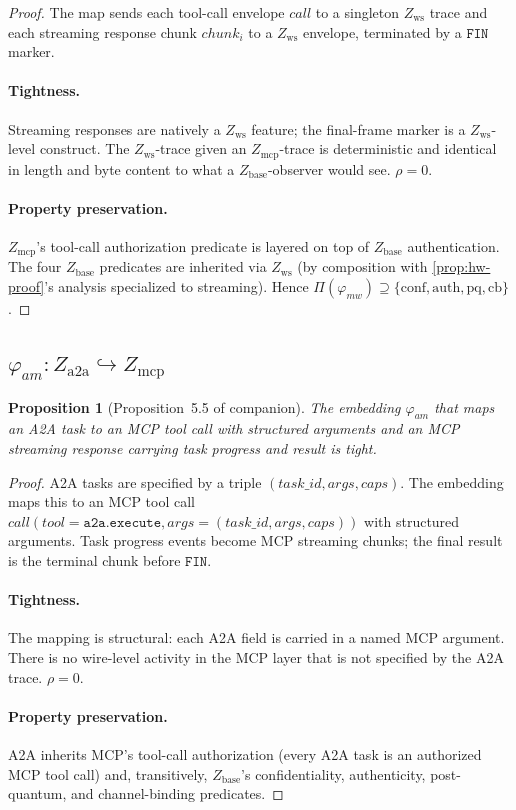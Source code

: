 \documentclass[11pt]{article}
\newtheorem{proposition}[theorem]{Proposition}
\theoremstyle{definition}
\theoremstyle{remark}
\newcommand{\Zb}{Z_{\mathrm{base}}}
\newcommand{\Zw}{Z_{\mathrm{ws}}}
\newcommand{\Zm}{Z_{\mathrm{mcp}}}
\newcommand{\Za}{Z_{\mathrm{a2a}}}
\begin{document}
\begin{proof}
The map sends each tool-call envelope $\mathit{call}$ to a singleton
$\Zw$ trace and each streaming response chunk $\mathit{chunk}_i$ to
a $\Zw$ envelope, terminated by a $\mathtt{FIN}$ marker.

\paragraph{Tightness.}
Streaming responses are natively a $\Zw$ feature; the final-frame
marker is a $\Zw$-level construct. The $\Zw$-trace given an
$\Zm$-trace is deterministic and identical in length and byte
content to what a $\Zb$-observer would see. $\rho = 0$.

\paragraph{Property preservation.}
$\Zm$'s tool-call authorization predicate is layered on top of $\Zb$
authentication. The four $\Zb$ predicates are inherited via $\Zw$
(by composition with \cref{prop:hw-proof}'s analysis specialized to
streaming). Hence
$\Pi(\varphi_{mw}) \supseteq \{\mathrm{conf}, \mathrm{auth},
\mathrm{pq}, \mathrm{cb}\}$.
\end{proof}

\subsection{$\varphi_{am} : \Za \hookrightarrow \Zm$}

\begin{proposition}[Proposition~5.5 of companion]
\label{prop:am-proof}
The embedding $\varphi_{am}$ that maps an A2A task to an MCP tool
call with structured arguments and an MCP streaming response
carrying task progress and result is tight.
\end{proposition}

\begin{proof}
A2A tasks are specified by a triple $(\mathit{task\_id}, \mathit{args},
\mathit{caps})$. The embedding maps this to an MCP tool call
$\mathit{call}(\mathit{tool} = \mathtt{a2a.execute},
\mathit{args} = (\mathit{task\_id}, \mathit{args}, \mathit{caps}))$
with structured arguments. Task progress events become MCP streaming
chunks; the final result is the terminal chunk before
$\mathtt{FIN}$.

\paragraph{Tightness.}
The mapping is structural: each A2A field is carried in a named MCP
argument. There is no wire-level activity in the MCP layer that is
not specified by the A2A trace. $\rho = 0$.

\paragraph{Property preservation.}
A2A inherits MCP's tool-call authorization (every A2A task is an
authorized MCP tool call) and, transitively, $\Zb$'s confidentiality,
authenticity, post-quantum, and channel-binding predicates.
\end{proof}
\end{document}
